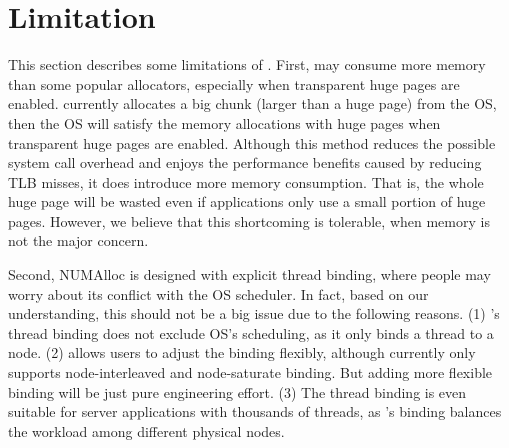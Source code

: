 \section{Limitation}
\label{sec:limit}

This section describes some limitations of \NM{}. First, \NM{} may consume more memory than some popular allocators, especially when transparent huge pages are enabled. \NM{} currently allocates a big chunk (larger than a huge page) from the OS, then the OS will satisfy the memory allocations with huge pages when transparent huge pages are enabled. Although this method reduces the possible system call overhead and enjoys the performance benefits caused by reducing TLB misses, it does introduce more memory consumption. That is, the whole huge page will be wasted even if applications only use a small portion of huge pages. However, we believe that this shortcoming is tolerable, when memory is not the major concern. 



Second, NUMAlloc is designed with explicit thread binding, where people may worry about its conflict with the OS scheduler. In fact, based on our understanding, this should not be a big issue due to the following reasons. (1) \NM{}'s thread binding does not exclude OS's scheduling, as it only binds a thread to a node. (2) \NM{} allows users to adjust the binding flexibly, although currently \NM{} only supports node-interleaved and node-saturate binding. But adding more flexible binding will be just pure engineering effort. (3) The thread binding is even suitable for server applications with thousands of threads, as \NM{}'s binding balances the workload among different physical nodes. 

